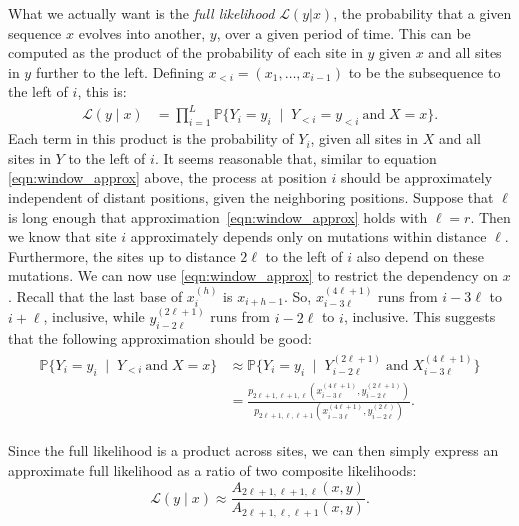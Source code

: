 \documentclass{article}
\renewcommand{\P}{\mathbb{P}}
\newcommand{\calS}{\mathcal{S}}  %
\newcommand{\given}{\;\mid\;}
\newcommand{\like}{\mathcal L}
\theoremstyle{plain}
\theoremstyle{definition}
\begin{document}
What we actually want is the \emph{full likelihood} $\like(y|x)$,
the probability that a given sequence $x$ evolves into another, $y$, over a given period of time.
This can be computed as the product of the probability of each site in $y$
given $x$ and all sites in $y$ further to the left.
Defining $x_{<i}=(x_1, \ldots, x_{i-1})$ to be the subsequence to the left of $i$, this is:
\begin{align*}
    \like(y \mid x) &= \prod_{i=1}^L \P\{ Y_i = y_i \given Y_{<i} = y_{<i} \ \text{and}\; X=x \} .
\end{align*}
Each term in this product is the probability of $Y_i$, given all sites in $X$
and all sites in $Y$ to the left of $i$.
It seems reasonable that, similar to equation \eqref{eqn:window_approx} above,
the process at position $i$ should be approximately independent
of distant positions, given the neighboring positions.
Suppose that $\ell$ is long enough that approximation~\eqref{eqn:window_approx} holds
with $\ell = r$.
Then we know that site $i$ approximately depends only on mutations within distance $\ell$.
Furthermore, the sites up to distance $2 \ell$ to the left of $i$
also depend on these mutations.
We can now use \eqref{eqn:window_approx} to restrict the dependency on $x$.
Recall that the last base of $x_i^{(h)}$ is $x_{i+h-1}$.
So, $x_{i-3\ell}^{(4\ell+1)}$ runs from $i-3\ell$ to $i + \ell$, inclusive, while $y_{i-2\ell}^{(2\ell+1)}$ runs from $i-2\ell$ to $i$, inclusive.
This suggests that the following approximation should be good:
\begin{align} \label{eqn:full_approx}
    \begin{split}
    \P\{ Y_i = y_i \given Y_{<i} \ \text{and}\; X=x \}
    &\approx
        \P\{ Y_i = y_i \given Y_{i-2\ell}^{(2\ell+1)} \;\text{and}\; X_{i-3\ell}^{(4\ell+1)} \}  \\
    &=
        \frac{
            p_{2\ell+1,\ell+1,\ell}(x_{i-3\ell}^{(4\ell+1)}, y_{i-2\ell}^{(2\ell+1)})
        }{
            p_{2\ell+1,\ell,\ell+1}(x_{i-3\ell}^{(4\ell+1)}, y_{i-2\ell}^{(2\ell)})
        }.
    \end{split}
\end{align}

Since the full likelihood is a product across sites,
we can then simply express an approximate full likelihood as
a ratio of two composite likelihoods:
\[
    \like(y \mid x) \approx \frac{ A_{2\ell+1, \ell+1, \ell}(x,y) }{ A_{2\ell+1, \ell, \ell+1}(x,y) }.
\]
\end{document}
